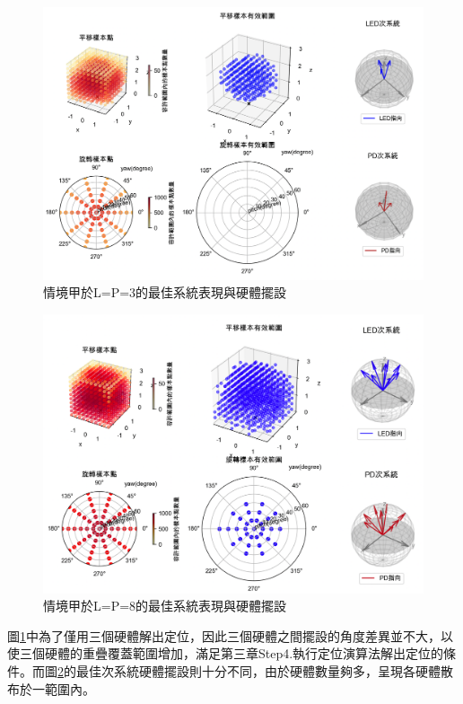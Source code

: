     \begin{figure}[htpb]
        \centering
        \includegraphics[width=15cm]{ch5pic/a_33.png}
        \caption{情境甲於L=P=3的最佳系統表現與硬體擺設}
        \label{pic:a_33}
    \end{figure}

    \begin{figure}[htpb]
        \centering
        \includegraphics[width=15cm]{ch5pic/a_88.png}
        \caption{情境甲於L=P=8的最佳系統表現與硬體擺設}
        \label{pic:a_88}
    \end{figure}

    圖\ref{pic:a_33}中為了僅用三個硬體解出定位，因此三個硬體之間擺設的角度差異並不大，以使三個硬體的重疊覆蓋範圍增加，滿足第三章Step4.執行定位演算法解出定位的條件。而圖\ref{pic:a_88}的最佳次系統硬體擺設則十分不同，由於硬體數量夠多，呈現各硬體散布於一範圍內。



